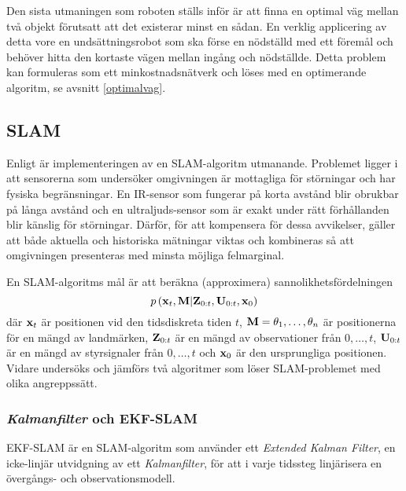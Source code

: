 \documentclass[11pt]{article}
\begin{document}
\begin{flushleft}
Den sista utmaningen som roboten ställs inför är att finna en optimal väg mellan två objekt förutsatt att det existerar minst en sådan. En verklig applicering av detta vore en undsättningsrobot som ska förse en nödställd med ett föremål och behöver hitta den kortaste vägen mellan ingång och nödställde. Detta problem kan formuleras som ett minkostnadsnätverk och löses med en optimerande algoritm, se avsnitt \ref{optimalvag}. 

\subsection{SLAM}
\label{slam}
Enligt \cite{ekf} är implementeringen av en SLAM-algoritm utmanande. Problemet ligger i att sensorerna som undersöker omgivningen är mottagliga för störningar och har fysiska begränsningar. En IR-sensor som fungerar på korta avstånd blir obrukbar på långa avstånd och en ultraljuds-sensor som är exakt under rätt förhållanden blir känslig för störningar. Därför, för att kompensera för dessa avvikelser, gäller att både aktuella och historiska mätningar viktas och kombineras så att omgivningen presenteras med minsta möjliga felmarginal. 

En SLAM-algoritms mål är att beräkna (approximera) sannolikhetsfördelningen
\begin{equation*}
	p\left(\textbf{\textrm{x}}_{t},\textbf{\textrm{M}} \vert \textbf{\textrm{Z}}_{0:t}, \textbf{\textrm{U}}_{0:t}, \textbf{\textrm{x}}_0 \right)
\end{equation*}
där $\textbf{\textrm{x}}_t$ är positionen vid den tidsdiskreta tiden $t$, $\textbf{\textrm{M}}=\theta_1,\ldots,\theta_n$ är positionerna för en mängd av landmärken, $\textbf{\textrm{Z}}_{0:t}$ är en mängd av observationer från $0,\ldots,t$, $\textbf{\textrm{U}}_{0:t}$ är en mängd av styrsignaler från $0,\ldots,t$ och $\textbf{\textrm{x}}_0$ är den ursprungliga positionen. Vidare undersöks och jämförs två algoritmer som löser SLAM-problemet med olika angreppssätt.   

\subsubsection{\emph{Kalmanfilter} och EKF-SLAM}
EKF-SLAM är en SLAM-algoritm som använder ett \emph{Extended Kalman Filter}, en icke-linjär utvidgning av ett \emph{Kalmanfilter}, för att i varje tidssteg  linjärisera en övergångs- och observationsmodell.


\end{flushleft}
\end{document}
